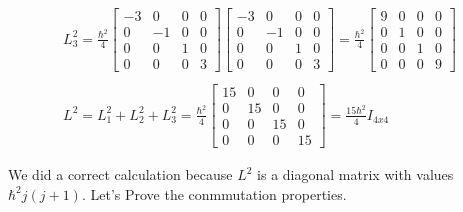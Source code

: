 \begin{equation}
\begin{array}{c}
    \\
    L_3^2 = \frac{\hbar^2}{4}\left[\begin{matrix}
      -3 & 0 & 0 & 0\\
      0 & -1 & 0 & 0\\
      0 & 0 & 1 & 0\\
      0 & 0 & 0 & 3
    \end{matrix}\right]\left[\begin{matrix}
      -3 & 0 & 0 & 0\\
      0 & -1 & 0 & 0\\
      0 & 0 & 1 & 0\\
      0 & 0 & 0 & 3
    \end{matrix}\right] =
    \frac{\hbar^2}{4}\left[\begin{matrix}
      9 & 0 & 0 & 0\\
      0 & 1 & 0 & 0\\
      0 & 0 & 1 & 0\\
      0 & 0 & 0 & 9
    \end{matrix}\right]
    \\

    \\
    L^2 = L_1^2 + L_2^2 + L_3^2 = \frac{\hbar^2}{4} \left[\begin{matrix}
      15 & 0 & 0 & 0\\
      0 & 15 & 0 & 0\\
      0 & 0 & 15 & 0\\
      0 & 0 & 0 & 15
    \end{matrix}\right] = \frac{15\hbar^2}{4} I_{4x4}
  \end{array}
\end{equation}

We did a correct calculation because $L^2$ is a diagonal matrix with values $\hbar^2j(j+1)$. Let's Prove the conmmutation properties.

